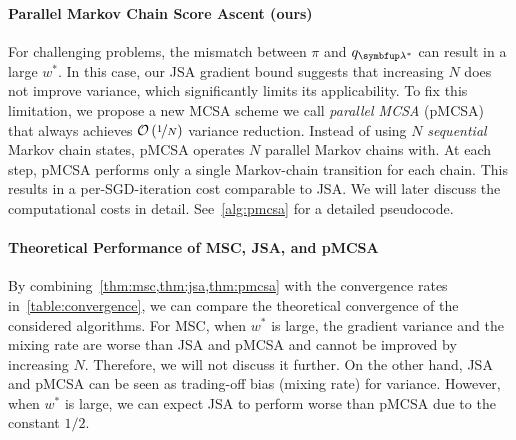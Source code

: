 \paragraph{Parallel Markov Chain Score Ascent (ours)}
For challenging problems, the mismatch between \(\pi\) and \(q_{\vlambda^*}\) can result in a large \(w^*\).
In this case, our JSA gradient bound suggests that increasing \(N\) does not improve variance, which significantly limits its applicability.
To fix this limitation, we propose a new MCSA scheme we call \textit{parallel MCSA} (pMCSA) that always achieves \(\mathcal{O}\left(\nicefrac{1}{N}\right)\) variance reduction.
Instead of using \(N\) \textit{sequential} Markov chain states, pMCSA operates \(N\) parallel Markov chains with.
At each step, pMCSA performs only a single Markov-chain transition for each chain.
This results in a per-SGD-iteration cost comparable to JSA.
We will later discuss the computational costs in detail.
See~\cref{alg:pmcsa} for a detailed pseudocode.




\vspace{-0.05in}
\paragraph{Theoretical Performance of MSC, JSA, and pMCSA}
By combining~\cref{thm:msc,thm:jsa,thm:pmcsa} with the convergence rates in~\cref{table:convergence}, we can compare the theoretical convergence of the considered algorithms.
For MSC, when \(w^*\) is large, the gradient variance and the mixing rate are worse than JSA and pMCSA and cannot be improved by increasing \(N\).
Therefore, we will not discuss it further.
On the other hand, JSA and pMCSA can be seen as trading-off bias (mixing rate) for variance.
However, when \(w^*\) is large, we can expect JSA to perform worse than pMCSA due to the constant \(1/2\).

\vspace{-0.05in}

